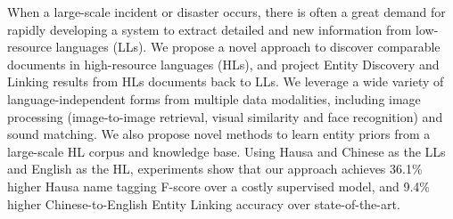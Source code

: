 When a large-scale incident or disaster occurs, there is often a great demand for rapidly developing a system to extract detailed and new information from low-resource languages (LLs). We propose a novel approach to discover comparable documents in high-resource languages (HLs), and project Entity Discovery and Linking results from HLs documents back to LLs. We leverage a wide variety of language-independent forms from multiple data modalities, including image processing (image-to-image retrieval, visual similarity and face recognition) and sound matching. We also propose novel methods to learn entity priors from a large-scale HL corpus and knowledge base. Using Hausa and Chinese as the LLs and English as the HL, experiments show that our approach achieves 36.1\% higher Hausa name tagging F-score over a costly supervised model, and 9.4\% higher Chinese-to-English Entity Linking accuracy over state-of-the-art.
